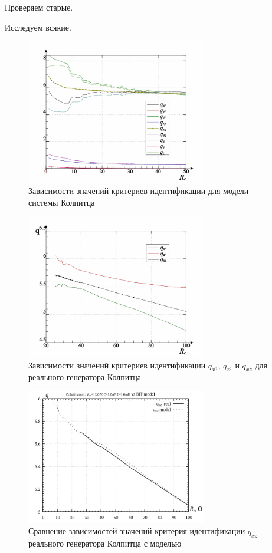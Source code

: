 Проверяем старые.

Исследуем всякие.

\begin{figure}[htb!]
\centerline{\includegraphics[width=0.7\textwidth]{p/colp_bjt_q-p_Rc_q.png} }
\caption{Зависимости значений критериев идентификации для модели системы Колпитца}
\label{atu:f:colp_bjt_q-p_Rc_q}
\end{figure}


\begin{figure}[htb!]
\centerline{\includegraphics[width=0.7\textwidth]{p/colp_read_q-p_Rc_q.png} }
  \caption{Зависимости значений критериев идентификации $q_{x^2}$, $q_{z^2}$ и $q_{xz}$ для реального генератора Колпитца}
\label{atu:f:colp_read_q-p_Rc_q-p_Rc_q}
\end{figure}

\begin{figure}[htb!]
\centerline{\includegraphics[width=0.7\textwidth]{p/colp_q_cml.png} }
\caption{Сравнение зависимостей значений критерия идентификации $q_{xz}$ реального генератора Колпитца с моделью}
\label{atu:f:colp_q_cml}
\end{figure}

